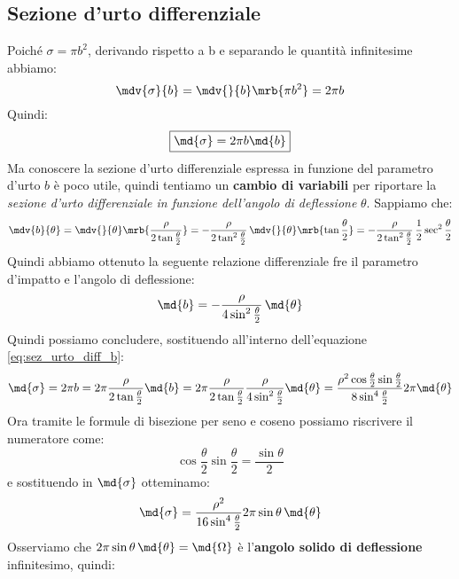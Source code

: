 \subsection{Sezione d'urto differenziale}
Poiché $\sigma = \pi b^2$, derivando rispetto a b e separando le quantità
infinitesime abbiamo:
\begin{equation}
	\mdv{\sigma}{b} = \mdv{}{b}\mrb{\pi b^2} = 2\pi b
\end{equation}
Quindi:
\begin{equation}
	\boxed{\md{\sigma} = 2\pi b \md{b}}
	\label{eq:sez_urto_diff_b}
\end{equation}
Ma conoscere la sezione d'urto differenziale espressa in funzione del parametro
d'urto $b$ è poco utile,
quindi tentiamo un \textbf{cambio di variabili} per riportare la
\textit{sezione d'urto differenziale in funzione
	dell'angolo di deflessione} $\theta$.
Sappiamo che:
\begin{equation}
	\mdv{b}{\theta} =
	\mdv{}{\theta} \mrb{\frac{\rho}{2\tan\frac{\theta}{2}}} =
	-\frac{\rho}{2\tan^2\frac{\theta}{2}} \,
	\mdv{}{\theta} \mrb{\tan\frac{\theta}{2}} =
	-\frac{\rho}{2\tan^2\frac{\theta}{2}} \,
	\frac{1}{2}\sec^2{\frac{\theta}{2}}
\end{equation}
Quindi abbiamo ottenuto la seguente relazione differenziale fre il parametro
d'impatto e l'angolo di deflessione:
\begin{equation}
	\md{b} = -\frac{\rho}{4\sin^2{\frac{\theta}{2}}} \, \md{\theta}
\end{equation}
Quindi possiamo concludere, sostituendo all'interno dell'equazione
\ref{eq:sez_urto_diff_b}:
\begin{equation}
	\md{\sigma} = 2\pi b = 2\pi\frac{\rho}{2\tan\frac{\theta}{2}} \md{b} =
	2\pi \frac{\rho}{2\tan\frac{\theta}{2}}
	\frac{\rho}{4\sin^2\frac{\theta}{2}} \md{\theta} =
	\frac{\rho^2 \cos\frac{\theta}{2}
		\sin\frac{\theta}{2}}{8\sin^4\frac{\theta}{2}}2\pi \md{\theta}
\end{equation}
Ora tramite le formule di bisezione per seno e coseno possiamo riscrivere il
numeratore come:
\begin{equation}
	\cos\frac{\theta}{2}\sin\frac{\theta}{2} = \frac{\sin\theta}{2}
\end{equation}
e sostituendo in $\md{\sigma}$ otteminamo:
\begin{equation}
	\md{\sigma} = \frac{\rho^2}{16\sin^4 \frac{\theta}{2}} 2\pi\sin\theta \,
	\md{\theta}
\end{equation}
Osserviamo che $2\pi\sin\theta \, \md{\theta} = \md{\Omega}$ è l'\textbf{angolo
	solido di deflessione} infinitesimo, quindi:
